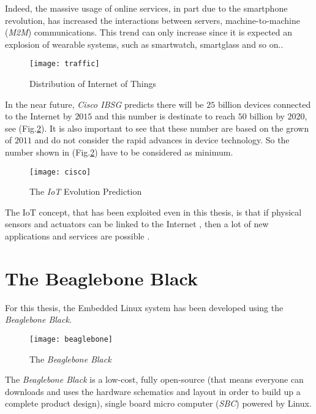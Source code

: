 Indeed, the massive usage of online services, in part due to the smartphone revolution, has increased the interactions between servers, machine-to-machine (\textit{M2M}) communications. This trend can only increase since it is expected an explosion of wearable systems, such as smartwatch, smartglass and so on..



\begin{figure}[h]
	\centering
	\texttt{[image: traffic]}
	\caption{Distribution of Internet of Things}
	\label{Fig:traffic}
	
\end{figure}

In the near future, \textit{Cisco IBSG} predicts there will be $25$ billion devices connected to the Internet by $2015$ and this number is destinate to reach $50$ billion by $2020$, see (Fig.\ref{Fig:cisco})\cite{CISCOIOT}. It is also important to see that these number are based on the grown of $2011$ and do  not consider the rapid advances in device technology. So the number shown in (Fig.\ref{Fig:cisco}) have to be considered as minimum.

\begin{figure}[h]
	\centering
	\texttt{[image: cisco]}
	\caption{The \textit{IoT} Evolution Prediction}
	\label{Fig:cisco}
	
\end{figure}


The IoT concept, that has been exploited even in this thesis, is that if physical sensors and actuators can be linked to the Internet , then a lot of new applications and services are possible \cite{EBB}.

\section{The Beaglebone Black}

For this thesis, the Embedded Linux system has been developed using the \textit{Beaglebone Black}.\\

\begin{figure}[h]
	\centering
	\texttt{[image: beaglebone]}
	\caption{The \textit{Beaglebone Black}}
	\label{Fig:beaglebone}
	
\end{figure}

The \textit{Beaglebone Black} is a low-cost, fully open-source (that means everyone can downloads and uses the hardware schematics and layout in order to build up a complete product design), single board micro computer (\textit{SBC}) powered by Linux. 

